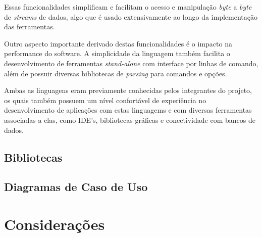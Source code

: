 Essas funcionalidades simplificam e facilitam o acesso e manipulação \emph{byte} a \emph{byte} de \emph{streams} de dados, algo que é usado extensivamente ao longo da implementação das ferramentas.

Outro aspecto importante derivado destas funcionalidades é o impacto na performance do software. %
A simplicidade da linguagem também facilita o desenvolvimento de ferramentas \emph{stand-alone} com interface por linhas de comando, além de possuir diversas bibliotecas de \emph{parsing} para comandos e opções.

Ambas as linguagens eram previamente conhecidas pelos integrantes do projeto, os quais também possuem um nível confortável de experiência no desenvolvimento de aplicações com estas linguagems e com diversas ferramentas associadas a elas, como IDE's, bibliotecas gráficas e conectividade com bancos de dados.

\subsection{Bibliotecas}
\subsection{Diagramas de Caso de Uso}
\section{Considerações}

